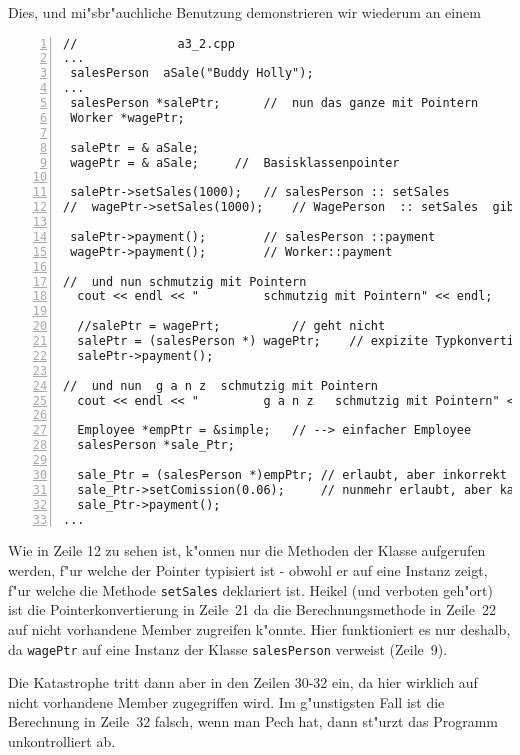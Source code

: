 Dies, und mi"sbr"auchliche Benutzung
demonstrieren wir wiederum an einem
\begin{lstlisting}[caption={Casting bei Klassenpointern.},label=lst:casting_klassen_2,
basicstyle=\scriptsize,numbers=left, numberstyle=\tiny, stepnumber=2, numbersep=5pt]
//				a3_2.cpp
...
 salesPerson  aSale("Buddy Holly");
...
 salesPerson *salePtr;		//	nun das ganze mit Pointern
 Worker *wagePtr;

 salePtr = & aSale;
 wagePtr = & aSale;		//	Basisklassenpointer

 salePtr->setSales(1000);	// salesPerson :: setSales
//  wagePtr->setSales(1000);	// WagePerson  :: setSales  gibt es nicht !!

 salePtr->payment();		// salesPerson ::payment
 wagePtr->payment();		// Worker::payment

//	und nun schmutzig mit Pointern
  cout << endl << "         schmutzig mit Pointern" << endl;

  //salePtr = wagePrt;			// geht nicht
  salePtr = (salesPerson *) wagePtr;	// expizite Typkonvertierung, gefaehrlich !!
  salePtr->payment();

//	und nun  g a n z  schmutzig mit Pointern
  cout << endl << "         g a n z   schmutzig mit Pointern" << endl;

  Employee *empPtr = &simple;	// --> einfacher Employee
  salesPerson *sale_Ptr;

  sale_Ptr = (salesPerson *)empPtr;	// erlaubt, aber inkorrekt
  sale_Ptr->setComission(0.06);		// nunmehr erlaubt, aber katastrophal
  sale_Ptr->payment();
...
\end{lstlisting}
%
%
%  

%
Wie in Zeile 12 zu sehen ist, k"onnen nur die Methoden der Klasse aufgerufen werden,
f"ur welche der Pointer typisiert ist - obwohl er auf eine Instanz zeigt, f"ur
welche die Methode \verb|setSales| deklariert ist.
Heikel (und verboten geh"ort) ist die  Pointerkonvertierung
in Zeile~21 da die Berechnungsmethode in Zeile~22 auf nicht vorhandene Member
zugreifen k"onnte. Hier funktioniert es nur deshalb, da \verb|wagePtr| auf eine
Instanz der Klasse \verb|salesPerson| verweist (Zeile~9).

Die Katastrophe tritt dann aber in den Zeilen 30-32 ein, da hier
wirklich auf nicht vorhandene Member zugegriffen wird.
Im g"unstigsten Fall ist die Berechnung in Zeile~32 falsch, wenn man Pech hat,
dann st"urzt das Programm unkontrolliert ab.

